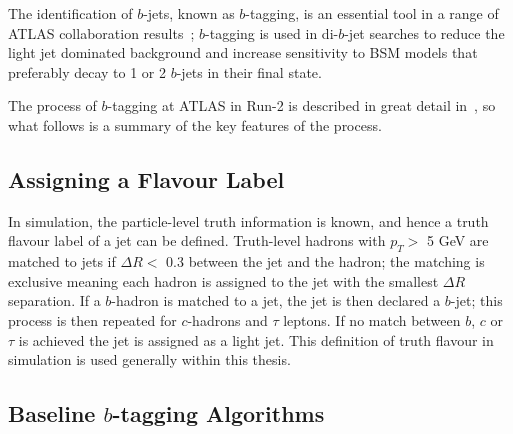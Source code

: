 The identification of $b$-jets, known as $b$-tagging, is an essential tool in a range of ATLAS collaboration results~\cite{obj-ttbar,obj-Hbb};
$b$-tagging is used in di-$b$-jet searches to reduce the light jet dominated background and increase 
sensitivity to BSM models that preferably decay to 1 or 2 $b$-jets in their final state.

The process of $b$-tagging at ATLAS in Run-2 is described in great
detail in~\cite{obj-bjets_algo_2015,obj-bjets_algo_2016},
so what follows is a summary of the key features of the process.

\subsection{Assigning a Flavour Label}
\label{sec:obj-bjets_label}

In simulation, the particle-level truth information is known, and hence a truth flavour label of a jet can be defined.
Truth-level hadrons with $p_{T} >$ 5 GeV are matched to jets if $\Delta R <$ 0.3 between the jet and the hadron;
the matching is exclusive meaning each hadron is assigned to the jet with the smallest $\Delta R$ separation.
If a $b$-hadron is matched to a jet, the jet is then declared a $b$-jet;
this process is then repeated for $c$-hadrons and $\tau$ leptons.
If no match between $b$, $c$ or $\tau$ is achieved the jet is assigned as a light jet.
This definition of truth flavour in simulation is used generally within this thesis.
   
\subsection{Baseline $b$-tagging Algorithms}


